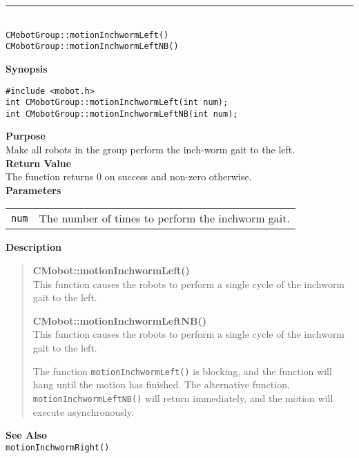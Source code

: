 \noindent
\vspace{5pt}
\rule{4.5in}{0.015in}\\
\noindent
{\LARGE \texttt{CMobotGroup::motionInchwormLeft()}}\\
{\LARGE \texttt{CMobotGroup::motionInchwormLeftNB()}}\\
{}

\noindent
{\bf Synopsis}
\vspace{-8pt}
\begin{verbatim}
#include <mobot.h>
int CMobotGroup::motionInchwormLeft(int num);
int CMobotGroup::motionInchwormLeftNB(int num);
\end{verbatim}

\noindent
{\bf Purpose}\\
Make all robots in the group perform the inch-worm gait to the left.\\

\noindent
{\bf Return Value}\\
The function returns 0 on success and non-zero otherwise.\\

\noindent
{\bf Parameters}\\
\vspace{-0.1in}
\begin{description}
\item               
\begin{tabular}{p{15 mm}p{145 mm}}
\texttt{num} & The number of times to perform the inchworm gait.\\
\end{tabular}
\end{description}

\noindent
{\bf Description}\\
\vspace{-12pt}
\begin{quote}
{\bf CMobot::motionInchwormLeft()}\\
This function causes the robots to perform a single cycle of the inchworm gait
to the left. 

{\bf CMobot::motionInchwormLeftNB()}\\
This function causes the robots to perform a single cycle of the inchworm gait
to the left. 

The function \texttt{motionInchwormLeft()} is blocking, and the function
will hang until the motion has finished. The alternative function, \texttt{motionInchwormLeftNB()} 
will return immediately, and the motion will execute asynchronously. \\
\end{quote}

\noindent
{\bf See Also}\\
\texttt{motionInchwormRight()}

